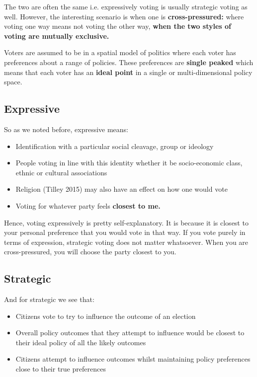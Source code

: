 \documentclass[12pt, letterpaper]{article}
\begin{document}
The two are often the same i.e. expressively voting is usually strategic voting as well. However, the interesting scenario is when one is \textbf{cross-pressured:} where voting one way means not voting the other way, \textbf{when the two styles of voting are mutually exclusive.}

Voters are assumed to be in a spatial model of politics where each voter has preferences about a range of policies. These preferences are \textbf{single peaked} which means that each voter has an \textbf{ideal point} in a single or multi-dimensional policy space.

\subsection{Expressive}
So as we noted before, expressive means:
\begin{itemize}
	\item Identification with a particular social cleavage, group or ideology
	\item People voting in line with this identity whether it be socio-economic class, ethnic or cultural associations
	\item Religion (Tilley 2015) may also have an effect on how one would vote
	\item Voting for whatever party feels \textbf{closest to me.}
\end{itemize}

Hence, voting expressively is pretty self-explanatory. It is because it is closest to your personal preference that you would vote in that way. If you vote purely in terms of expression, strategic voting does not matter whatsoever. When you are cross-pressured, you will choose the party closest to you.

\subsection{Strategic}
And for strategic we see that:
\begin{itemize}
	\item Citizens vote to try to influence the outcome of an election
	\item Overall policy outcomes that they attempt to influence would be closest to their ideal policy of all the likely outcomes
	\item Citizens attempt to influence outcomes whilst maintaining policy preferences close to their true preferences
\end{itemize}
\end{document}
